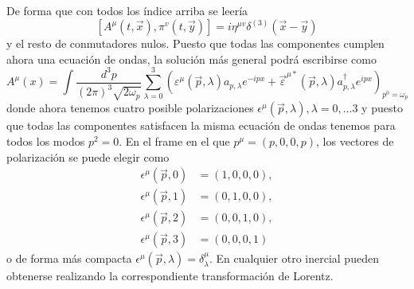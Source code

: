 De forma que con todos los índice arriba se leería
\begin{equation*}
\left[A^{\mu}(t, \vec{x}), \pi^{v}(t, \vec{y})\right]=i \eta^{\mu v} \delta^{(3)}(\vec{x}-\vec{y}) \tag{6.53}
\end{equation*}
y el resto de conmutadores nulos.
Puesto que todas las componentes cumplen ahora una ecuación de ondas, la solución más general podrá escribirse como
\begin{equation*}
A^{\mu}(x)=\int \frac{d^{3} p}{(2 \pi)^{3} \sqrt{2 \omega_{p}}} \sum_{\lambda=0}^{3}\left(\varepsilon^{\mu}(\vec{p}, \lambda) a_{p, \lambda} e^{-i p x}+\vec{\varepsilon}^{\mu *}(\vec{p}, \lambda) a_{p, \lambda}^{\dagger} e^{i p x}\right)_{p^{0}=\omega_{p}} \tag{6.54}
\end{equation*}
donde ahora tenemos cuatro posible polarizaciones $\epsilon^{\mu}(\vec{p}, \lambda), \lambda=0, \ldots 3$ y puesto que todas las componentes satisfacen la misma ecuación de ondas tenemos para todos los modos $p^{2}=0$. En el frame en el que $p^{\mu}=(p, 0,0, p)$, los vectores de polarización se puede elegir como
$$
\begin{align*}
\epsilon^{\mu}(\vec{p}, 0) & =(1,0,0,0), \\
\epsilon^{\mu}(\vec{p}, 1) & =(0,1,0,0),  \tag{6.55}\\
\epsilon^{\mu}(\vec{p}, 2) & =(0,0,1,0), \\
\epsilon^{\mu}(\vec{p}, 3) & =(0,0,0,1)
\end{align*}
$$
o de forma más compacta $\epsilon^{\mu}(\vec{p}, \lambda)=\delta_{\lambda}^{\mu}$. En cualquier otro inercial pueden obtenerse realizando la correspondiente transformación de Lorentz.

